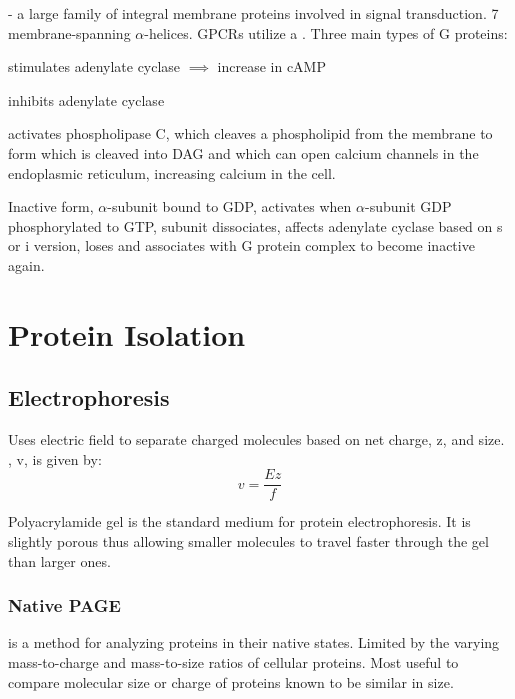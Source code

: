 \documentclass[../Bio_chemistryReview.tex]{subfiles}
\begin{document}
 - a large family of integral membrane
proteins involved in signal transduction. 7 membrane-spanning $ \alpha
$-helices. GPCRs utilize a . Three main types
of G proteins:
\begin{description}
  \item  {}  stimulates adenylate cyclase $ \implies $
    increase in cAMP 
  \item {} inhibits adenylate cyclase
  \item {} activates phospholipase C, which cleaves a
    phospholipid from the membrane to form  which is cleaved
    into DAG and  which can open calcium channels in the
    endoplasmic reticulum, increasing calcium in the cell.  
\end{description}

Inactive form, $ \alpha $-subunit bound to GDP, activates when $ \alpha
$-subunit GDP phosphorylated to GTP, subunit dissociates, affects adenylate
cyclase based on s or i version, loses  and associates with G
protein complex to become inactive again.

\section{Protein Isolation\supdag}

\subsection{Electrophoresis\supdag}

Uses electric field to separate charged molecules based on net charge, z, and
size. , v, is given by: 
\begin{equation}
  v = \dfrac{Ez}{f}
\end{equation}

Polyacrylamide gel is the standard medium for protein electrophoresis. It is
slightly porous thus allowing smaller molecules to travel faster through the gel
than larger ones.

\subsubsection{Native PAGE\supdag}

 is a method for analyzing
proteins in their native states. Limited by the varying mass-to-charge and
mass-to-size ratios of cellular proteins. Most useful to compare molecular size
or charge of proteins known to be similar in size.
\end{document}
